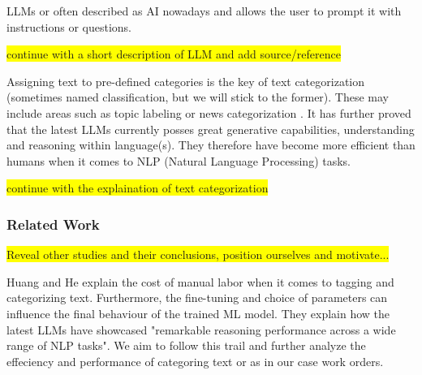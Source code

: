 \documentclass{article}
\begin{document}
LLMs or often described as AI nowadays and allows the user to prompt it with instructions or questions.

\colorbox{yellow}{continue with a short description of LLM and add source/reference}

Assigning text to pre-defined categories is the key of text categorization
(sometimes named classification, but we will stick to the former).
These may include areas such as topic labeling or news categorization \cite{zhang2024}.
It has further proved that the latest LLMs currently posses great generative capabilities, understanding
and reasoning within language(s).
They therefore have become more efficient than humans when it comes to NLP (Natural Language Processing)
tasks.

\colorbox{yellow}{continue with the explaination of text categorization}

\subsubsection{Related Work}
\colorbox{yellow}{Reveal other studies and their conclusions, position ourselves and motivate...}






Huang and He \cite{huang2024} explain the cost of manual labor when it comes to tagging and categorizing text.
Furthermore, the fine-tuning and choice of parameters can influence the final behaviour of the trained
ML model.
They explain how the latest LLMs have showcased "remarkable reasoning performance across a wide range of
NLP tasks".
We aim to follow this trail and further analyze the effeciency and performance of categoring text or as in our
case work orders.
\bigskip
\end{document}
